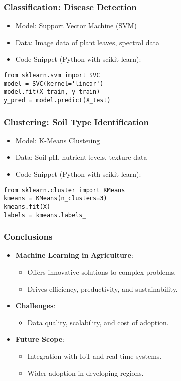 \begin{frame}[fragile]\frametitle{Classification: Disease Detection}
	\begin{itemize}
	\item Model: Support Vector Machine (SVM)
	\item Data: Image data of plant leaves, spectral data
	\item Code Snippet (Python with scikit-learn):
	\end{itemize}
	
\begin{lstlisting}
from sklearn.svm import SVC
model = SVC(kernel='linear')
model.fit(X_train, y_train)
y_pred = model.predict(X_test)
\end{lstlisting}
\end{frame}

\begin{frame}[fragile]\frametitle{Clustering: Soil Type Identification}
	\begin{itemize}
	\item Model: K-Means Clustering
	\item Data: Soil pH, nutrient levels, texture data
	\item Code Snippet (Python with scikit-learn):
	\end{itemize}

\begin{lstlisting}
from sklearn.cluster import KMeans
kmeans = KMeans(n_clusters=3)
kmeans.fit(X)
labels = kmeans.labels_
\end{lstlisting}
\end{frame}

\begin{frame}[fragile]\frametitle{Conclusions}
  \begin{itemize}
    \item \textbf{Machine Learning in Agriculture}:
      \begin{itemize}
        \item Offers innovative solutions to complex problems.
        \item Drives efficiency, productivity, and sustainability.
      \end{itemize}
    \item \textbf{Challenges}:
      \begin{itemize}
        \item Data quality, scalability, and cost of adoption.
      \end{itemize}
    \item \textbf{Future Scope}:
      \begin{itemize}
        \item Integration with IoT and real-time systems.
        \item Wider adoption in developing regions.
      \end{itemize}
  \end{itemize}
\end{frame}
